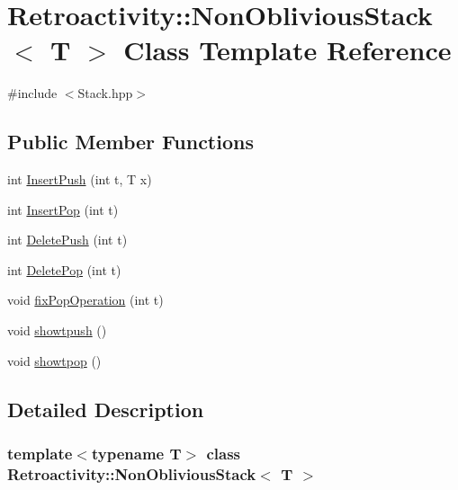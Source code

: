 \hypertarget{classRetroactivity_1_1NonObliviousStack}{}\section{Retroactivity\+:\+:Non\+Oblivious\+Stack$<$ T $>$ Class Template Reference}
\label{classRetroactivity_1_1NonObliviousStack}


{\ttfamily \#include $<$Stack.\+hpp$>$}

\subsection*{Public Member Functions}
\begin{DoxyCompactItemize}
\item 
int \hyperlink{classRetroactivity_1_1NonObliviousStack_a51ae6ac67c430e6456d5dbeecc519ce5}{Insert\+Push} (int t, T x)
\item 
int \hyperlink{classRetroactivity_1_1NonObliviousStack_ae6efaa3ffb84206f0ffc8171df994cc9}{Insert\+Pop} (int t)
\item 
int \hyperlink{classRetroactivity_1_1NonObliviousStack_a8b35e4694da19ceb5cfe86b692f22fee}{Delete\+Push} (int t)
\item 
int \hyperlink{classRetroactivity_1_1NonObliviousStack_ab50e11a16a4c8ed79b305e6e6d33cdd9}{Delete\+Pop} (int t)
\item 
void \hyperlink{classRetroactivity_1_1NonObliviousStack_aa7710e91e99204175b1bf8f15b580f13}{fix\+Pop\+Operation} (int t)
\item 
void \hyperlink{classRetroactivity_1_1NonObliviousStack_aabc118d3007e7d56ddf25d71b64f2538}{showtpush} ()
\item 
void \hyperlink{classRetroactivity_1_1NonObliviousStack_a3e6f31a8d574a50fa828e90cd43bb64f}{showtpop} ()
\end{DoxyCompactItemize}


\subsection{Detailed Description}
\subsubsection*{template$<$typename T$>$\newline
class Retroactivity\+::\+Non\+Oblivious\+Stack$<$ T $>$}

